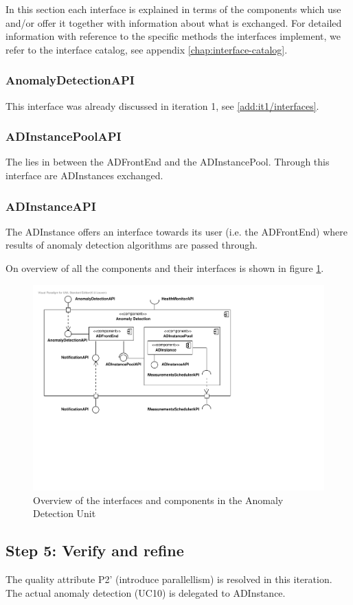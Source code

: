 \npar In this section each interface is explained in terms of the components
which use and/or offer it together with information about what is exchanged. For
detailed information with reference to the specific methods the interfaces
implement, we refer to the interface catalog, see appendix
\ref{chap:interface-catalog}.

\subsubsection{AnomalyDetectionAPI}

\npar This interface was already discussed in iteration 1, see
\ref{add:it1/interfaces}.

\subsubsection{ADInstancePoolAPI}

\npar The  lies in between the ADFrontEnd and the
ADInstancePool. Through this interface are ADInstances exchanged.

\subsubsection{ADInstanceAPI}

\npar The ADInstance offers an interface towards its user (i.e. the ADFrontEnd)
where results of anomaly detection algorithms are passed through.

\npar On overview of all the components and their interfaces is shown in figure
\ref{fig:it6/interfaces}.

\begin{figure}[H]
	\begin{centering}
		\includegraphics[width=\textwidth]{figs/add-it6-interfaces.pdf}
		\caption{Overview of the interfaces and components in the Anomaly Detection
		Unit}
		\label{fig:it6/interfaces}
	\end{centering}
\end{figure}

\subsection{Step 5: Verify and refine}
\label{add:it6/verification}

\npar The quality attribute P2' (introduce parallellism) is resolved in this
iteration. The actual anomaly detection (UC10) is delegated to ADInstance.
